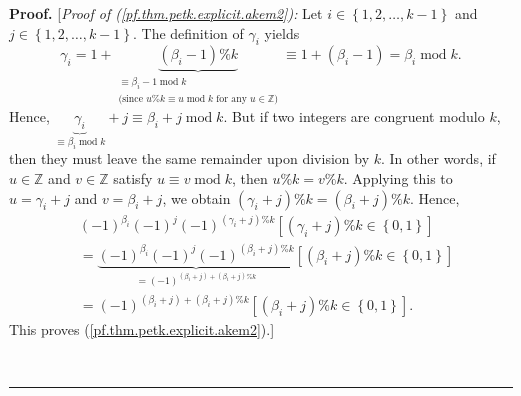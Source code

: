 \documentclass[numbers=enddot,12pt,final,onecolumn,notitlepage]{scrartcl}%
\theoremstyle{definition}
\newenvironment{proof}[1][Proof]{\noindent\textbf{#1.} }{\ \rule{0.5em}{0.5em}}
\newenvironment{verlong}{}{}
\begin{document}
\begin{proof}
\begin{verlong}
[\textit{Proof of (\ref{pf.thm.petk.explicit.akem2}):} Let $i\in\left\{
1,2,\ldots,k-1\right\}  $ and $j\in\left\{  1,2,\ldots,k-1\right\}  $. The
definition of $\gamma_{i}$ yields%
\[
\gamma_{i}=1+\underbrace{\left(  \beta_{i}-1\right)  \%k}_{\substack{\equiv
\beta_{i}-1\operatorname{mod}k\\\text{(since }u\%k\equiv u\operatorname{mod}%
k\text{ for any }u\in\mathbb{Z}\text{)}}}\equiv1+\left(  \beta_{i}-1\right)
=\beta_{i}\operatorname{mod}k.
\]
Hence, $\underbrace{\gamma_{i}}_{\equiv\beta_{i}\operatorname{mod}k}%
+j\equiv\beta_{i}+j\operatorname{mod}k$. But if two integers are congruent
modulo $k$, then they must leave the same remainder upon division by $k$. In
other words, if $u\in\mathbb{Z}$ and $v\in\mathbb{Z}$ satisfy $u\equiv
v\operatorname{mod}k$, then $u\%k=v\%k$. Applying this to $u=\gamma_{i}+j$ and
$v=\beta_{i}+j$, we obtain $\left(  \gamma_{i}+j\right)  \%k=\left(  \beta
_{i}+j\right)  \%k$. Hence,%
\begin{align*}
&  \left(  -1\right)  ^{\beta_{i}}\left(  -1\right)  ^{j}\left(  -1\right)
^{\left(  \gamma_{i}+j\right)  \%k}\left[  \left(  \gamma_{i}+j\right)
\%k\in\left\{  0,1\right\}  \right] \\
&  =\underbrace{\left(  -1\right)  ^{\beta_{i}}\left(  -1\right)  ^{j}\left(
-1\right)  ^{\left(  \beta_{i}+j\right)  \%k}}_{=\left(  -1\right)  ^{\left(
\beta_{i}+j\right)  +\left(  \beta_{i}+j\right)  \%k}}\left[  \left(
\beta_{i}+j\right)  \%k\in\left\{  0,1\right\}  \right] \\
&  =\left(  -1\right)  ^{\left(  \beta_{i}+j\right)  +\left(  \beta
_{i}+j\right)  \%k}\left[  \left(  \beta_{i}+j\right)  \%k\in\left\{
0,1\right\}  \right]  .
\end{align*}
This proves (\ref{pf.thm.petk.explicit.akem2}).]
\end{verlong}


\end{proof}
\end{document}
